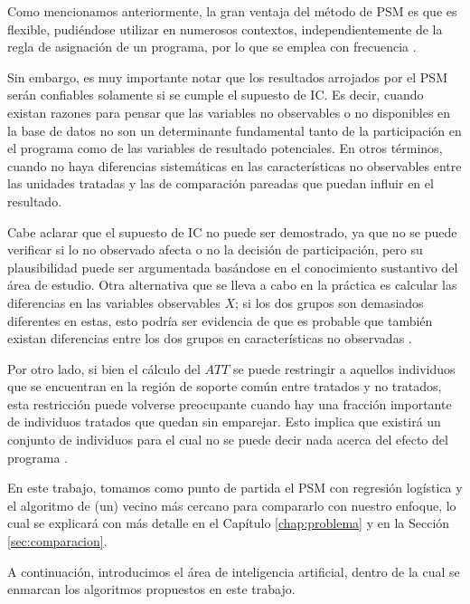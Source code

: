 \documentclass[../../main.tex]{subfiles}
\begin{document}
Como mencionamos anteriormente, la gran ventaja del método de PSM es que es flexible,
pudiéndose utilizar en numerosos contextos, independientemente de la regla de asignación
de un programa, por lo que se emplea con frecuencia \cite{bernal}.

Sin embargo, es muy importante notar que los resultados arrojados por el PSM serán
confiables solamente si se cumple el supuesto de IC. Es decir, cuando existan razones para
pensar que las variables no observables o no disponibles en la base de datos no son un
determinante fundamental tanto de la participación en el programa como de las variables de
resultado potenciales. En otros términos, cuando no haya diferencias sistemáticas en las
características no observables entre las unidades tratadas y las de comparación pareadas
que puedan influir en el resultado.

Cabe aclarar que el supuesto de IC no puede ser demostrado, ya que no se puede verificar
si lo no observado afecta o no la decisión de participación, pero su plausibilidad puede
ser argumentada basándose en el conocimiento sustantivo del área de estudio. Otra
alternativa que se lleva a cabo en la práctica es calcular las diferencias en las
variables observables \(X\); si los dos grupos son demasiados diferentes en estas, esto
podría ser evidencia de que es probable que también existan diferencias entre los dos
grupos en características no observadas \cite{bernal}.

Por otro lado, si bien el cálculo del \(ATT\) se puede restringir a aquellos individuos
que se encuentran en la región de soporte común entre tratados y no tratados, esta
restricción puede volverse preocupante cuando hay una fracción importante de individuos
tratados que quedan sin emparejar. Esto implica que existirá un conjunto de individuos
para el cual no se puede decir nada acerca del efecto del programa \cite{bernal}.

\bigskip
En este trabajo, tomamos como punto de partida el PSM con regresión logística y el
algoritmo de (un) vecino más cercano para compararlo con nuestro enfoque, lo cual se
explicará con más detalle en el Capítulo \ref{chap:problema} y en la Sección
\ref{sec:comparacion}.

A continuación, introducimos el área de inteligencia artificial, dentro de la cual se
enmarcan los algoritmos propuestos en este trabajo.
\end{document}
